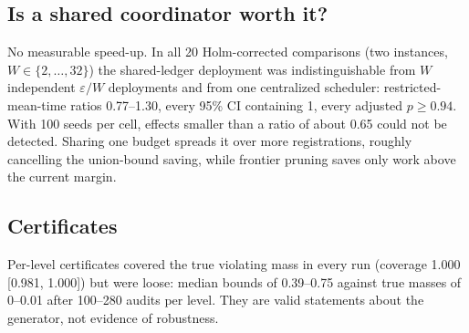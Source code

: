 \documentclass[11pt]{article}
\theoremstyle{definition}
\begin{document}
\subsection{Is a shared coordinator worth it?}
No measurable speed-up. In all 20 Holm-corrected comparisons (two instances, $W\in\{2,\dots,32\}$) the shared-ledger deployment was indistinguishable from $W$ independent $\varepsilon/W$ deployments and from one centralized scheduler: restricted-mean-time ratios 0.77--1.30, every 95\% CI containing 1, every adjusted $p\ge0.94$. With 100 seeds per cell, effects smaller than a ratio of about 0.65 could not be detected. Sharing one budget spreads it over more registrations, roughly cancelling the union-bound saving, while frontier pruning saves only work above the current margin.

\subsection{Certificates}
Per-level certificates covered the true violating mass in every run (coverage 1.000 [0.981, 1.000]) but were loose: median bounds of 0.39--0.75 against true masses of 0--0.01 after 100--280 audits per level. They are valid statements about the generator, not evidence of robustness.
\end{document}
